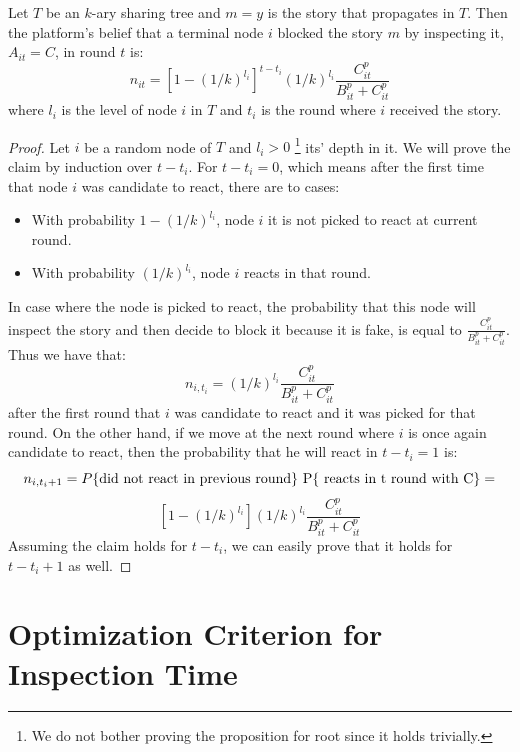\begin{prop}
	Let $T$ be an $k$-ary sharing tree and $m=y$ is the story that propagates in $T$. Then the platform's belief that a terminal node $i$ blocked the story $m$ by inspecting it, $A_{it}=C$, in round $t$ is:
	$$ n_{it} =  [1-(1/k)^{l_i}]^{t-t_i} (1/k)^{l_i} \frac{C_{it}^p}{B_{it}^p+C_{it}^p}$$
	where $l_i$ is the level of node $i$ in $T$ and $t_i$ is the round where $i$ received the story.
\end{prop}

\begin{proof}
	Let $i$ be a random node of $T$ and $l_i > 0$ \footnote{We do not bother proving the proposition for root since it holds trivially.} its' depth in it. We will prove the claim by induction over $t-t_i$. For $t-t_i = 0$, which means after the first time that node $i$ was candidate to react, there are to cases:
	\begin{itemize}
		\item With probability $1-(1/k)^{l_i}$, node $i$ it is not picked to react at current round.
		\item With probability $(1/k)^{l_i}$, node $i$ reacts in that round.
	\end{itemize} 
In case where the node is picked to react, the probability that this node will inspect the story and then decide to block it because it is fake, is equal to $\frac{C_{it}^p}{B_{it}^p+C_{it}^p}$. Thus we have that: $$n_{i,t_i} = (1/k)^{l_i} \frac{C_{it}^p}{B_{it}^p+C_{it}^p}$$
after the first round that $i$ was candidate to react and it was picked for that round. On the other hand, if we move at the next round where $i$ is once again candidate to react, then the probability that he will react in $t-t_i = 1$ is: $$n_{i,t_i+1} = P\{\text{did not react in previous round\} P\{ \text{reacts in t round with C}\}} = $$
$$[1-(1/k)^{l_i}] (1/k)^{l_i} \frac{C_{it}^p}{B_{it}^p+C_{it}^p}$$ Assuming the claim holds for $t-t_i$, we can easily prove that it holds for $t-t_i+1$ as well.
\end{proof}

\section{Optimization Criterion for Inspection Time}
\label{sec:optimize}

